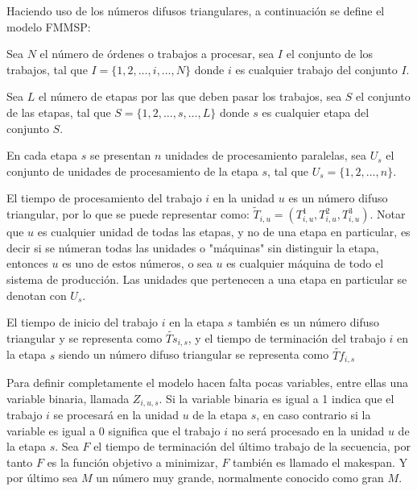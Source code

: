 \documentclass{article}
\begin{document}
\vspace{\baselineskip}
Haciendo uso de los números difusos triangulares, a continuación se define el
modelo FMMSP: \autocite{modFMMSP}

\vspace{\baselineskip}
Sea $N$ el número de órdenes o trabajos a procesar, sea $I$ el conjunto de
los trabajos, tal que $I = \{1,2,\dots,i,\dots,N\}$ donde $i$ es cualquier
trabajo del conjunto $I$.

\vspace{\baselineskip}
Sea $L$ el número de etapas por las que deben pasar los trabajos, sea $S$ el
conjunto de las etapas, tal que $S = \{1,2,\dots,s,\dots,L\}$ donde $s$ es
cualquier etapa del conjunto $S$.

\vspace{\baselineskip}
En cada etapa $s$ se presentan $n$ unidades de procesamiento paralelas, sea
$U_s$ el conjunto de unidades de procesamiento de la etapa $s$, tal que
$U_s = \{1,2,\dots,n\}$.

\vspace{\baselineskip}
El tiempo de procesamiento del trabajo $i$ en la unidad $u$ es un número
difuso triangular, por lo que se puede representar como: 
$\tilde{T}_{i,u} = (T_{i,u}^{1},T_{i,u}^{2},T_{i,u}^{3})$. Notar que $u$
es cualquier unidad de todas las etapas, y no de una etapa en particular,
es decir si se númeran todas las unidades o "máquinas" sin distinguir la
etapa, entonces $u$ es uno de estos números, o sea $u$ es cualquier
máquina de todo el sistema de producción. Las unidades que pertenecen a una
etapa en particular se denotan con $U_s$.

El tiempo de inicio del trabajo $i$ en la etapa $s$ también es un número
difuso triangular y se representa como $\widetilde{Ts}_{i,s}$, y el tiempo
de terminación del trabajo $i$ en la etapa $s$ siendo un número difuso
triangular se representa como $\widetilde{Tf}_{i,s}$

\vspace{\baselineskip}
Para definir completamente el modelo hacen falta pocas variables, entre ellas
una variable binaria, llamada
$Z_{i,u,s}$. Si la variable binaria es igual a 1 indica que el trabajo $i$ se
procesará en la unidad $u$ de la etapa $s$, en caso contrario si la variable
es igual a 0 significa que el trabajo $i$ no será procesado en la unidad $u$ de
la etapa $s$. Sea $F$ el tiempo de terminación del último trabajo
de la secuencia, por tanto $F$ es la función objetivo a minimizar, $F$ también
es llamado el makespan. Y por último
sea $M$ un número muy grande, normalmente conocido como gran $M$.
\end{document}
